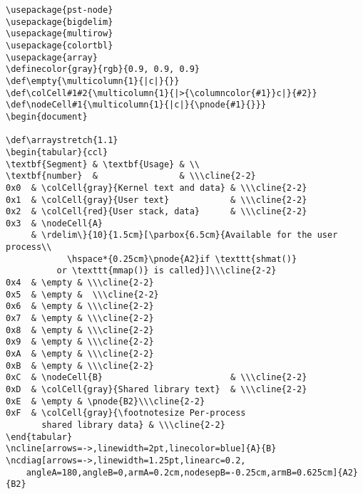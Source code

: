 \documentclass[12pt,a4paper]{article}
\def\empty{\multicolumn{1}{|c|}{}}
\def\colCell#1#2{\multicolumn{1}{|>{\columncolor{#1}}c|}{#2}}
\def\nodeCell#1{\multicolumn{1}{|c|}{\pnode{#1}{}}}
\begin{document}
\begin{verbatim}
\usepackage{pst-node}
\usepackage{bigdelim}
\usepackage{multirow}
\usepackage{colortbl}
\usepackage{array}
\definecolor{gray}{rgb}{0.9, 0.9, 0.9}
\def\empty{\multicolumn{1}{|c|}{}}
\def\colCell#1#2{\multicolumn{1}{|>{\columncolor{#1}}c|}{#2}}
\def\nodeCell#1{\multicolumn{1}{|c|}{\pnode{#1}{}}}
\begin{document}

\def\arraystretch{1.1}
\begin{tabular}{ccl}
\textbf{Segment} & \textbf{Usage} & \\
\textbf{number}  &                & \\\cline{2-2}
0x0  & \colCell{gray}{Kernel text and data} & \\\cline{2-2}
0x1  & \colCell{gray}{User text}            & \\\cline{2-2}
0x2  & \colCell{red}{User stack, data}      & \\\cline{2-2}
0x3  & \nodeCell{A}                         
     & \rdelim\}{10}{1.5cm}[\parbox{6.5cm}{Available for the user process\\
    	    \hspace*{0.25cm}\pnode{A2}if \texttt{shmat()}
	      or \texttt{mmap()} is called}]\\\cline{2-2}
0x4  & \empty & \\\cline{2-2}
0x5  & \empty &  \\\cline{2-2}
0x6  & \empty & \\\cline{2-2}
0x7  & \empty & \\\cline{2-2}
0x8  & \empty & \\\cline{2-2}
0x9  & \empty & \\\cline{2-2}
0xA  & \empty & \\\cline{2-2}
0xB  & \empty & \\\cline{2-2}
0xC  & \nodeCell{B}                         & \\\cline{2-2}
0xD  & \colCell{gray}{Shared library text}  & \\\cline{2-2}
0xE  & \empty & \pnode{B2}\\\cline{2-2}
0xF  & \colCell{gray}{\footnotesize Per-process 
       shared library data} & \\\cline{2-2}
\end{tabular}
\ncline[arrows=->,linewidth=2pt,linecolor=blue]{A}{B}
\ncdiag[arrows=->,linewidth=1.25pt,linearc=0.2,
    angleA=180,angleB=0,armA=0.2cm,nodesepB=-0.25cm,armB=0.625cm]{A2}{B2}
\end{verbatim}
\end{document}
